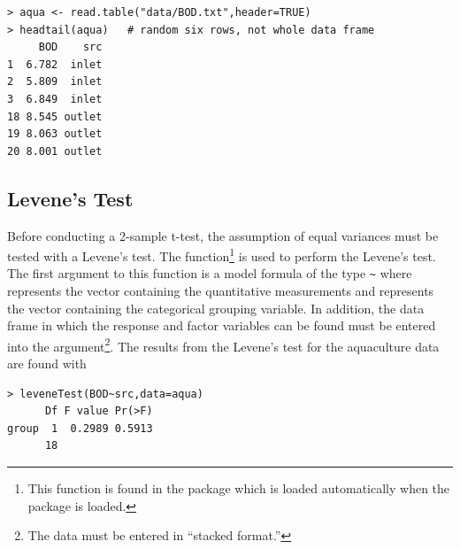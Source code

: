 \documentclass[10pt,openany]{book}\usepackage[]{graphicx}\usepackage[]{color}
\makeatletter
\newenvironment{kframe}{%
 \def\at@end@of@kframe{}%
 \ifinner\ifhmode%
  \def\at@end@of@kframe{\end{minipage}}%
  \begin{minipage}{\columnwidth}%
 \fi\fi%
 \def\FrameCommand##1{\hskip\@totalleftmargin \hskip-\fboxsep
 \colorbox{shadecolor}{##1}\hskip-\fboxsep
     \hskip-\linewidth \hskip-\@totalleftmargin \hskip\columnwidth}%
 \MakeFramed {\advance\hsize-\width
   \@totalleftmargin\z@ \linewidth\hsize
   \@setminipage}}%
 {\par\unskip\endMakeFramed%
 \at@end@of@kframe}
\newenvironment{knitrout}{}{} %
\makeatother
\begin{document}
\begin{knitrout}
\color{fgcolor}\begin{kframe}
\begin{verbatim}
> aqua <- read.table("data/BOD.txt",header=TRUE)
> headtail(aqua)   # random six rows, not whole data frame
     BOD    src
1  6.782  inlet
2  5.809  inlet
3  6.849  inlet
18 8.545 outlet
19 8.063 outlet
20 8.001 outlet
\end{verbatim}
\end{kframe}
\end{knitrout}


\vspace{-12pt}

\subsection{Levene's Test}
Before conducting a 2-sample t-test, the assumption of equal variances must be tested with a Levene's test.  The  function\footnote{This function is found in the  package which is loaded automatically when the  package is loaded.} is used to perform the Levene's test.  The first argument to this function is a model formula of the type \verb"~" where  represents the vector containing the quantitative measurements and  represents the vector containing the categorical grouping variable.  In addition, the data frame in which the response and factor variables can be found must be entered into the  argument\footnote{The data must be entered in ``stacked format.''}.  The results from the Levene's test for the aquaculture data are found with

\begin{knitrout}
\color{fgcolor}\begin{kframe}
\begin{verbatim}
> leveneTest(BOD~src,data=aqua)
      Df F value Pr(>F)
group  1  0.2989 0.5913
      18               
\end{verbatim}
\end{kframe}
\end{knitrout}
\end{document}
